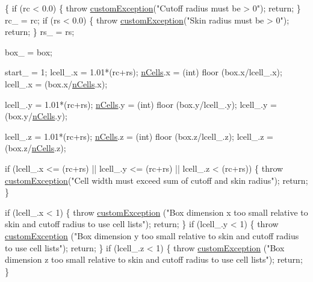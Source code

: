 \begin{DoxyCode}
                                                                             \{
    \textcolor{keywordflow}{if} (rc < 0.0) \{
    \textcolor{keywordflow}{throw} \hyperlink{classcustom_exception}{customException}(\textcolor{stringliteral}{"Cutoff radius must be > 0"});
    \textcolor{keywordflow}{return};
    \}
    rc\_ = rc;
    \textcolor{keywordflow}{if} (rs < 0.0) \{
    \textcolor{keywordflow}{throw} \hyperlink{classcustom_exception}{customException}(\textcolor{stringliteral}{"Skin radius must be > 0"});
    \textcolor{keywordflow}{return};
    \}
    rs\_ = rs;

    box\_ = box;

    start\_ = 1;
    lcell\_.x = 1.01*(rc+rs);
    \hyperlink{classcell_list__cpu_ae86e1c9604a39bc8a493fa0f6538fd37}{nCells}.x = (int) floor (box.x/lcell\_.x);
    lcell\_.x = (box.x/\hyperlink{classcell_list__cpu_ae86e1c9604a39bc8a493fa0f6538fd37}{nCells}.x);

    lcell\_.y = 1.01*(rc+rs);
    \hyperlink{classcell_list__cpu_ae86e1c9604a39bc8a493fa0f6538fd37}{nCells}.y = (int) floor (box.y/lcell\_.y);
    lcell\_.y = (box.y/\hyperlink{classcell_list__cpu_ae86e1c9604a39bc8a493fa0f6538fd37}{nCells}.y);

    lcell\_.z = 1.01*(rc+rs);
    \hyperlink{classcell_list__cpu_ae86e1c9604a39bc8a493fa0f6538fd37}{nCells}.z = (int) floor (box.z/lcell\_.z);
    lcell\_.z = (box.z/\hyperlink{classcell_list__cpu_ae86e1c9604a39bc8a493fa0f6538fd37}{nCells}.z);

    \textcolor{keywordflow}{if} (lcell\_.x <= (rc+rs) || lcell\_.y <= (rc+rs) || lcell\_.z < (rc+rs)) \{
    \textcolor{keywordflow}{throw} \hyperlink{classcustom_exception}{customException}(\textcolor{stringliteral}{"Cell width must exceed sum of cutoff
       and skin radius"});
    \textcolor{keywordflow}{return};
    \}

    \textcolor{keywordflow}{if} (lcell\_.x < 1) \{
    \textcolor{keywordflow}{throw} \hyperlink{classcustom_exception}{customException} (\textcolor{stringliteral}{"Box dimension x too small relative
       to skin and cutoff radius to use cell lists"});
    \textcolor{keywordflow}{return};
    \}
    \textcolor{keywordflow}{if} (lcell\_.y < 1) \{
    \textcolor{keywordflow}{throw} \hyperlink{classcustom_exception}{customException} (\textcolor{stringliteral}{"Box dimension y too small relative
       to skin and cutoff radius to use cell lists"});
    \textcolor{keywordflow}{return};
    \}
    \textcolor{keywordflow}{if} (lcell\_.z < 1) \{
    \textcolor{keywordflow}{throw} \hyperlink{classcustom_exception}{customException} (\textcolor{stringliteral}{"Box dimension z too small relative
       to skin and cutoff radius to use cell lists"});
    \textcolor{keywordflow}{return};
    \}


\end{DoxyCode}
